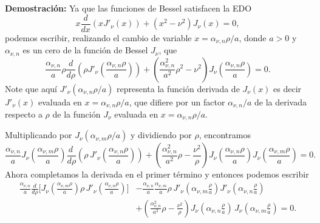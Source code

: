 \begin{scriptsize}
\textbf{Demostración:}
Ya que las funciones de Bessel satisfacen la EDO
\begin{equation}
x \frac{d}{dx} \left( x J'_\nu(x) \right) + (x^2 - \nu^2) J_\nu(x) = 0,
\end{equation}
podemos escribir, realizando el cambio de variable $x = \alpha_{\nu,n}{\rho}/{a}$, donde $a>0$ y $\alpha_{\nu,n}$ es un cero de la función de Bessel $J_\nu$, que
\begin{equation}\label{rdrJ}
\frac{\alpha_{\nu,n}}{a}\rho \frac{d}{d\rho} \left( \rho J'_\nu \left(\frac{\alpha_{\nu,n}\rho}{a}\right) \right) + \left( \frac{\alpha_{\nu,n}^2}{a^2} \rho^2 - \nu^2 \right) J_\nu\left(\frac{\alpha_{\nu,n}\rho}{a}\right) = 0.
\end{equation}
Note que aquí $J'_\nu(\alpha_{\nu,n}\rho/a)$ representa la función derivada de $J_\nu(x)$ es decir $J'_\nu(x)$ evaluada en $x = \alpha_{\nu,n}{\rho}/{a}$, que difiere por un factor $\alpha_{\nu,n}/a$ de la derivada respecto a $\rho$ de la función $J_\nu$ evaluada en $x = \alpha_{\nu,n}{\rho}/{a}$.

Multiplicando por $J_\nu\left(\alpha_{\nu,m} {\rho}/{a}\right)$ y dividiendo por $\rho$, encontramos
\begin{equation}
\frac{\alpha_{\nu,n}}{a}J_\nu\left(\frac{\alpha_{\nu,m}\rho}{a}\right) \frac{d\ }{d\rho}\left(\rho\,J'_\nu \left(\frac{\alpha_{\nu,n}\rho}{a}\right)\right) + \left( \frac{\alpha_{\nu,n}^2}{a^2} \rho - \frac{\nu^2}{\rho} \right) J_\nu\left(\frac{\alpha_{\nu,n}\rho}{a}\right) J_\nu\left(\frac{\alpha_{\nu,m}\rho}{a}\right) = 0.
\end{equation}
Ahora completamos la derivada en el primer término y entonces podemos escribir
\begin{align}
\frac{\alpha_{\nu,n}}{a}\frac{d}{d\rho} \Big[ J_\nu\left(\frac{\alpha_{\nu,m}\rho}{a}\right) \rho\, J'_\nu\left(\frac{\alpha_{\nu,n}\rho}{a}\right) \Big] &- \frac{\alpha_{\nu,n}}{a}\frac{\alpha_{\nu,m}}{a}\rho\, J'_\nu\left(\alpha_{\nu,m} \frac{\rho}{a}\right) J'_\nu\left(\alpha_{\nu,n} \frac{\rho}{a}\right) \\
&+ \left( \frac{\alpha_{\nu,n}^2}{a^2} \rho - \frac{\nu^2}{\rho} \right) J_\nu \left(\alpha_{\nu,n} \frac{\rho}{a}\right)\, J_\nu \left(\alpha_{\nu,m} \frac{\rho}{a}\right) = 0.
\end{align}


\end{scriptsize}
